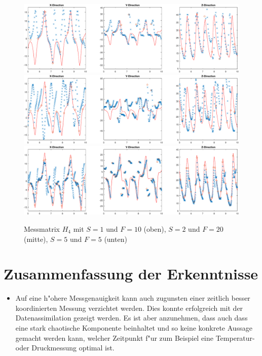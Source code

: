 \begin{refsection}
\begin{figure}
\centering
\includegraphics[width=\hsize]{kalman/figures/H4R10S1.pdf}
\includegraphics[width=\hsize]{kalman/figures/H4R20S2.pdf}
\includegraphics[width=\hsize]{kalman/figures/H4R05S5.pdf}
\caption{Messmatrix $H_{4}$ mit $S=1$ und $F=10$ (oben), $S=2$ und $F=20$ (mitte), $S=5$ und $F=5$ (unten)}
\label{kalman:H4}
\end{figure}

\section{Zusammenfassung der Erkenntnisse}
\begin{itemize}

\item
Auf eine h"ohere Messgenauigkeit kann auch zugunsten einer zeitlich besser koordinierten Messung verzichtet werden. Dies konnte erfolgreich mit der Datenassimilation gezeigt werden. Es ist aber anzunehmen, dass auch dass eine stark chaotische Komponente beinhaltet und so keine konkrete Aussage gemacht werden kann, welcher Zeitpunkt f"ur zum Beispiel eine Temperatur- oder Druckmessung optimal ist. 


\end{itemize}
\end{refsection}
